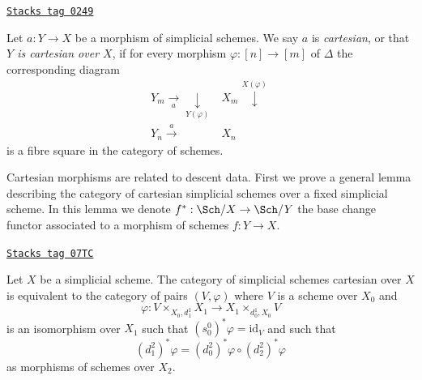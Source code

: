 \begin{definition}
\label{spaces-simplicial-definition-cartesian-morphism}
\href{https://stacks.math.columbia.edu/tag/0249}{\texttt{Stacks tag 0249}}

Let $a : Y \to X$ be a morphism of simplicial schemes.
We say $a$ is {\it cartesian}, or that {\it $Y$ is cartesian over $X$},
if for every morphism $\varphi : [n] \to [m]$ of $\Delta$ the corresponding
diagram
$$
\begin{array}{cc}Y_m \underset{a}{\longrightarrow}\underset{Y(\varphi)}{\downarrow} & X_m \overset{X(\varphi)}{\downarrow} \\ Y_n \overset{a}{\longrightarrow} & X_n\end{array}
$$
is a fibre square in the category of schemes.
\end{definition}

Cartesian morphisms are related to descent data. First we prove a general
lemma describing the category of cartesian simplicial schemes over a
fixed simplicial scheme. In this lemma we denote $f^* : \Sch/X \to \Sch/Y$
the base change functor associated to a morphism of schemes $f :Y \to X$.

\begin{lemma}
\label{spaces-simplicial-lemma-characterize-cartesian-schemes}
\href{https://stacks.math.columbia.edu/tag/07TC}{\texttt{Stacks tag 07TC}}

Let $X$ be a simplicial scheme. The category of simplicial schemes cartesian
over $X$ is equivalent to the category of pairs $(V, \varphi)$
where $V$ is a scheme over $X_0$ and
$$
\varphi :
V \times_{X_0, d^1_1} X_1
\longrightarrow
X_1 \times_{d^1_0, X_0} V
$$
is an isomorphism over $X_1$ such that
$(s_0^0)^*\varphi = \text{id}_V$ and such that
$$
(d^2_1)^*\varphi = (d^2_0)^*\varphi \circ (d^2_2)^*\varphi
$$
as morphisms of schemes over $X_2$.
\end{lemma}

